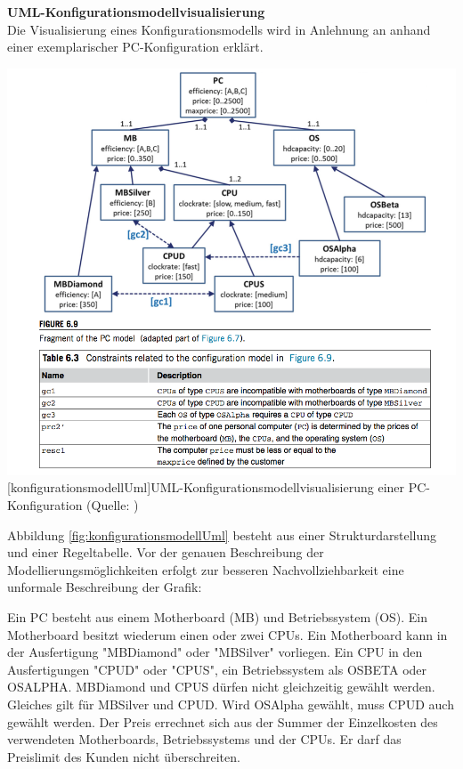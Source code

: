 \documentclass[12pt,a4paper,bibliography=totocnumbered,listof=totoc]{scrartcl}
\begin{document}
\textbf{UML-Konfigurationsmodellvisualisierung}\\
Die Visualisierung eines Konfigurationsmodells wird in Anlehnung an \citeauthor{felferning14} anhand einer exemplarischer PC-Konfiguration erklärt.

\vspace{1em}
\begin{minipage}{\linewidth}
	\centering
	\includegraphics[width=0.9\linewidth]{Abbildungen/konfigurationsmodellUml.png}
	[konfigurationsmodellUml]{UML-Konfigurationsmodellvisualisierung einer PC-Konfiguration (Quelle: \cite{felferning14})}
	\label{fig:konfigurationsmodellUml}
\end{minipage}
\vspace{1em}

Abbildung \ref{fig:konfigurationsmodellUml} besteht aus einer Strukturdarstellung und einer Regeltabelle. Vor der genauen Beschreibung der Modellierungsmöglichkeiten erfolgt zur besseren Nachvollziehbarkeit eine unformale Beschreibung der Grafik:

Ein PC besteht aus einem Motherboard (MB) und Betriebssystem (OS). Ein Motherboard besitzt wiederum einen oder zwei CPUs. Ein Motherboard kann in der Ausfertigung "MBDiamond" oder "MBSilver" vorliegen. Ein CPU in den Ausfertigungen "CPUD" oder "CPUS", ein Betriebssystem als OSBETA oder OSALPHA. MBDiamond und CPUS dürfen nicht gleichzeitig gewählt werden. Gleiches gilt für MBSilver und CPUD. Wird OSAlpha gewählt, muss CPUD auch gewählt werden. Der Preis errechnet sich aus der Summer der Einzelkosten des verwendeten Motherboards, Betriebssystems und der CPUs. Er darf das Preislimit des Kunden nicht überschreiten.
\end{document}
